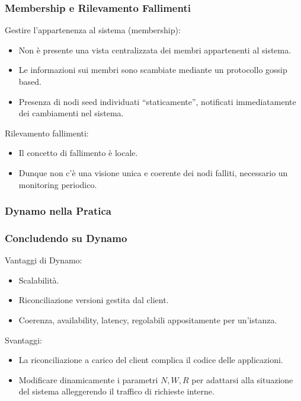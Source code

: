 \begin{frame}
  \frametitle{Membership e Rilevamento Fallimenti}
  \begin{block}{Gestire l'appartenenza al sistema (membership):}
  \begin{itemize}
  \item Non è presente una vista centralizzata dei membri appartenenti al sistema.
  \item Le informazioni sui membri sono scambiate mediante un protocollo \alert{gossip based}.
  \item Presenza di nodi \alert{seed} individuati ``staticamente'', notificati immediatamente dei cambiamenti nel sistema.
  \end{itemize}
  \end{block}
  \begin{block}{Rilevamento fallimenti:}
  \begin{itemize}
  \item Il concetto di fallimento è locale.
  \item Dunque non c'è una visione unica e coerente dei nodi falliti, necessario un monitoring periodico.
  \end{itemize}
  \end{block}
\end{frame}


\begin{frame}
  \frametitle{Dynamo nella Pratica}
\end{frame}


\begin{frame}
  \frametitle{Concludendo su Dynamo}
  \begin{block}{Vantaggi di Dynamo:}
    \begin{itemize}
    \item Scalabilità.
    \item Riconciliazione versioni gestita dal client.
    \item Coerenza, availability, latency, regolabili appositamente per un'istanza.
    \end{itemize}
  \end{block}
  \begin{block}{Svantaggi:}
  \begin{itemize}
  \item La riconciliazione a carico del client complica il codice delle applicazioni.
  \item Modificare dinamicamente i parametri $N, W, R$ per adattarsi alla situazione del sistema alleggerendo il traffico di richieste interne. 
  \end{itemize}
  \end{block}
\end{frame}

